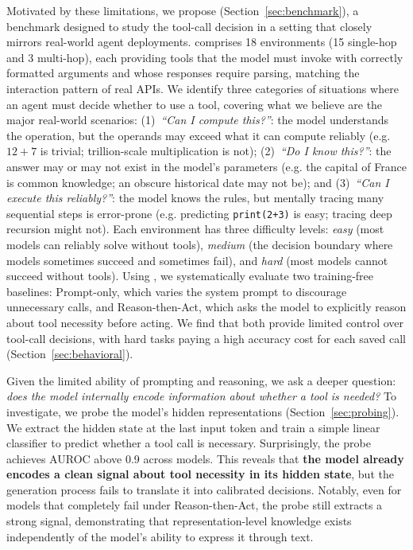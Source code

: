 Motivated by these limitations, we propose \benchmark{} (Section~\ref{sec:benchmark}), a benchmark designed to study the tool-call decision in a setting that closely mirrors real-world agent deployments. \benchmark{} comprises 18 environments (15 single-hop and 3 multi-hop), each providing tools that the model must invoke with correctly formatted arguments and whose responses require parsing, matching the interaction pattern of real APIs. We identify three categories of situations where an agent must decide whether to use a tool, covering what we believe are the major real-world scenarios: (1)~\emph{``Can I compute this?''}: the model understands the operation, but the operands may exceed what it can compute reliably (e.g. $12+7$ is trivial; trillion-scale multiplication is not); (2)~\emph{``Do I know this?''}: the answer may or may not exist in the model's parameters (e.g. the capital of France is common knowledge; an obscure historical date may not be); and (3)~\emph{``Can I execute this reliably?''}: the model knows the rules, but mentally tracing many sequential steps is error-prone (e.g. predicting \texttt{print(2+3)} is easy; tracing deep recursion might not). Each environment has three difficulty levels: \emph{easy} (most models can reliably solve without tools), \emph{medium} (the decision boundary where models sometimes succeed and sometimes fail), and \emph{hard} (most models cannot succeed without tools). Using \benchmark{}, we systematically evaluate two training-free baselines: Prompt-only, which varies the system prompt to discourage unnecessary calls, and Reason-then-Act, which asks the model to explicitly reason about tool necessity before acting. We find that both provide limited control over tool-call decisions, with hard tasks paying a high accuracy cost for each saved call (Section~\ref{sec:behavioral}).

Given the limited ability of prompting and reasoning, we ask a deeper question: \textit{does the model internally encode information about whether a tool is needed?} To investigate, we probe the model's hidden representations (Section~\ref{sec:probing}). We extract the hidden state at the last input token and train a simple linear classifier to predict whether a tool call is necessary. Surprisingly, the probe achieves AUROC above 0.9 across models. This reveals that \textbf{the model already encodes a clean signal about tool necessity in its hidden state}, but the generation process fails to translate it into calibrated decisions. Notably, even for models that completely fail under Reason-then-Act, the probe still extracts a strong signal, demonstrating that representation-level knowledge exists independently of the model's ability to express it through text.

